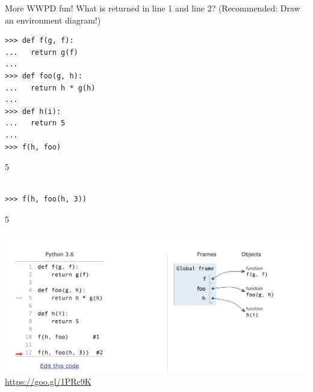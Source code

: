 \begin{blocksection}
\question More WWPD fun! What is returned in line 1 and line 2? (Recommended: Draw an environment diagram!)

\begin{lstlisting}
>>> def f(g, f):
...   return g(f)
...
>>> def foo(g, h):
...   return h * g(h)
...
>>> def h(i):
...   return 5
...
>>> f(h, foo)
\end{lstlisting}

\begin{solution}

5
\end{solution}

\begin{lstlisting}

>>> f(h, foo(h, 3))
\end{lstlisting}
\begin{solution}

5
\end{solution}
\begin{solution}
\includegraphics[scale=0.5]{foohi.png}
\newline
\url{https://goo.gl/1PRc9K}
\end{solution}
\end{blocksection}
